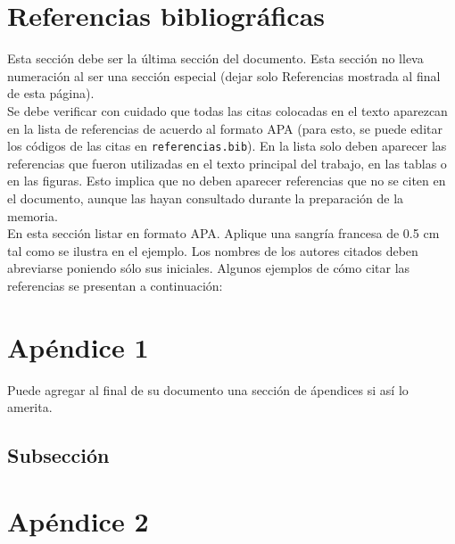 \documentclass[11pt,letterpaper]{article}
\begin{document}
\section{Referencias bibliográficas}
Esta sección debe ser la última sección del documento. Esta sección no lleva numeración al ser una sección especial (dejar solo Referencias mostrada al final de esta página).\\

Se debe verificar con cuidado que todas las citas colocadas en el texto aparezcan en la lista de referencias de acuerdo al formato APA (para esto, se puede editar los códigos de las citas en \texttt{referencias.bib}). En la lista solo deben aparecer las referencias que fueron utilizadas en el texto principal del trabajo, en las tablas o en las figuras. Esto implica que no deben aparecer referencias que no se citen en el documento, aunque las hayan consultado durante la preparación de la memoria.\\

En esta sección listar en formato APA. Aplique una sangría francesa de 0.5 cm tal como se ilustra en el ejemplo.  Los nombres de los autores citados deben abreviarse poniendo sólo sus iniciales. Algunos ejemplos de cómo citar las referencias se presentan a continuación:

\printbibliography

\clearpage

\appendix

\section{Apéndice 1}

Puede agregar al final de su documento una sección de ápendices si así lo amerita.

\subsection{Subsección}

\lipsum[1]

\section{Apéndice 2}

\end{document}
